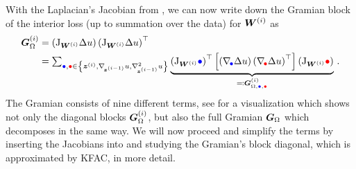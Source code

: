 With the Laplacian's Jacobian from , we can now write down the Gramian block of the interior loss (up to summation over the data) for ${\bm{W}}^{(i)}$ as
\begin{align}\label{eq:fisher}
  \begin{split}
    {\bm{G}}_{\Omega}^{(i)}
    &=
      \left(
      \mathrm{J}_{{\bm{W}}^{(i)}} \Delta u
      \right)
      \left(
      \mathrm{J}_{{\bm{W}}^{(i)}} \Delta u
      \right)^{\top}
    \\
    &=
      \textstyle
      \sum_{\textcolor{blue}{\bullet}, \textcolor{red}{\bullet} \in \left\{ {\bm{z}}^{(i)}, \nabla_{\!{{\bm{z}}^{(i-1)}}}u, \nabla_{\!{{\bm{z}}^{(i-1)}}}^{2}u \right\}}
      \underbrace{
      \left(
      \mathrm{J}_{{\bm{W}}^{(i)}}\textcolor{blue}{\bullet}
      \right)^{\top}
      \left[
      \left(
      \nabla_{\!{\textcolor{blue}{\bullet}}}\Delta u
      \right)
      \left(
      \nabla_{\!{\textcolor{red}{\bullet}}}\Delta u
      \right)^{\top}
      \right]
      \left(
      \mathrm{J}_{{\bm{W}}^{(i)}}\textcolor{red}{\bullet}
      \right)}_{
      \eqqcolon {\bm{G}}_{\Omega,\textcolor{blue}{\bullet}, \textcolor{red}{\bullet}}^{(i)}
      }\,.
  \end{split}
\end{align}
The Gramian consists of nine different terms, see  for a visualization which shows not only the diagonal blocks ${\bm{G}}_{\Omega}^{(i)}$, but also the full Gramian ${\bm{G}}_{\Omega}$ which decomposes in the same way.
We will now proceed and simplify the terms by inserting the Jacobians into  and studying the Gramian's block diagonal, which is approximated by KFAC, in more detail.



